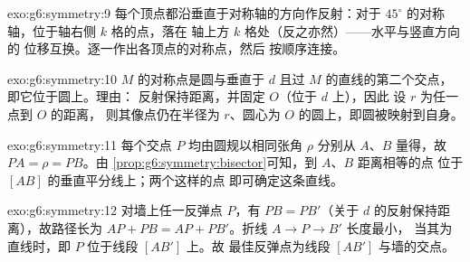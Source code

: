 \begin{solution}{exo:g6:symmetry:9}
每个顶点都沿垂直于对称轴的方向作反射：对于
$45^\circ$ 的对称轴，位于轴右侧 $k$ 格的点，落在
轴上方 $k$ 格处（反之亦然）——水平与竖直方向的
位移互换。逐一作出各顶点的对称点，然后
按顺序连接。
\end{solution}

\begin{solution}{exo:g6:symmetry:10}
$M$ 的对称点是圆与垂直于
$d$ 且过 $M$ 的直线的第二个交点，即它位于圆上。理由：
反射保持距离，并固定 $O$（位于 $d$ 上），因此
设 $r$ 为任一点到 $O$ 的距离，
则其像点仍在半径为 $r$、圆心为 $O$ 的圆上，即圆被映射到自身。
\end{solution}

\begin{solution}{exo:g6:symmetry:11}
每个交点 $P$ 均由圆规以相同张角 $\rho$
分别从 $A$、$B$ 量得，故 $PA = \rho = PB$。由
\cref{prop:g6:symmetry:bisector}可知，到 $A$、$B$ 距离相等的点
位于 $[AB]$ 的垂直平分线上；两个这样的点
即可确定这条直线。
\end{solution}

\begin{solution}{exo:g6:symmetry:12}
对墙上任一反弹点 $P$，有 $PB = PB'$（关于
$d$ 的反射保持距离），故路径长为
$AP + PB = AP + PB'$。折线 $A \to P \to B'$ 长度最小，
当其为直线时，即 $P$ 位于线段 $[AB']$ 上。故
最佳反弹点为线段 $[AB']$ 与墙的交点。
\end{solution}

